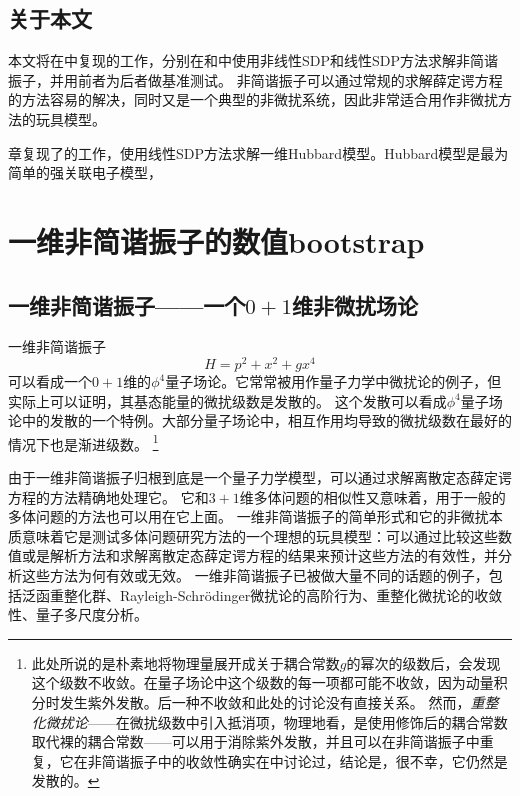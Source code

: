 \documentclass[oneside]{fduthesis}
\begin{document}
\section{关于本文}

本文将在中复现\parencite{han_matrix}的工作，分别在和中使用非线性SDP和线性SDP方法求解非简谐振子，并用前者为后者做基准测试。
非简谐振子可以通过常规的求解薛定谔方程的方法容易的解决，同时又是一个典型的非微扰系统，因此非常适合用作非微扰方法的玩具模型。

章复现了\parencite{han_manybody}的工作，使用线性SDP方法求解一维Hubbard模型。Hubbard模型是最为简单的强关联电子模型，

\chapter{一维非简谐振子的数值bootstrap}\label{chap:oscillator}

\section{一维非简谐振子——一个$0+1$维非微扰场论}

一维非简谐振子
\begin{equation}
    H = p^2 + x^2 + g x^4
\end{equation}
可以看成一个$0+1$维的$\phi^4$量子场论。它常常被用作量子力学中微扰论的例子，但实际上可以证明，其基态能量的微扰级数是发散的\cite{PhysRev.184.1231}。
这个发散可以看成$\phi^4$量子场论中的发散的一个特例。大部分量子场论中，相互作用均导致的微扰级数在最好的情况下也是渐进级数\cite{Jackiw_effective}。%
\footnote{此处所说的是朴素地将物理量展开成关于耦合常数$g$的幂次的级数后，会发现这个级数不收敛。在量子场论中这个级数的每一项都可能不收敛，因为动量积分时发生紫外发散。后一种不收敛和此处的讨论没有直接关系。
然而，\emph{重整化微扰论}——在微扰级数中引入抵消项，物理地看，是使用修饰后的耦合常数取代裸的耦合常数——可以用于消除紫外发散，并且可以在非简谐振子中重复，它在非简谐振子中的收敛性确实在\parencite{Bender-1970uz}中讨论过，结论是，很不幸，它仍然是发散的。}

由于一维非简谐振子归根到底是一个量子力学模型，可以通过求解离散定态薛定谔方程的方法精确地处理它。
它和$3+1$维多体问题的相似性又意味着，用于一般的多体问题的方法也可以用在它上面。
一维非简谐振子的简单形式和它的非微扰本质意味着它是测试多体问题研究方法的一个理想的玩具模型：可以通过比较这些数值或是解析方法和求解离散定态薛定谔方程的结果来预计这些方法的有效性，并分析这些方法为何有效或无效。
一维非简谐振子已被做大量不同的话题的例子，包括泛函重整化群\cite{Nagy-2010fv}、Rayleigh-Schrödinger微扰论的高阶行为\cite{bender199041}、重整化微扰论的收敛性\cite{Bender-1970uz}、量子多尺度分析\cite{Bender_1996}。
\end{document}
